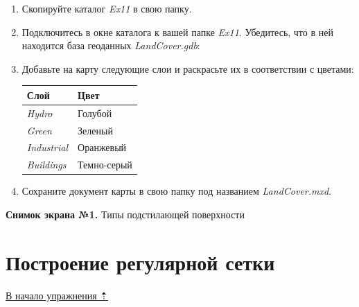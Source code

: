 \documentclass[12pt,]{book}
\begin{document}
\begin{enumerate}
\def\labelenumi{\arabic{enumi}.}
\item
  Скопируйте каталог \emph{Ex11} в свою папку.
\item
  Подключитесь в окне каталога к вашей папке \emph{Ex11}. Убедитесь, что в ней находится база геоданных \emph{LandCover.gdb}:
\item
  Добавьте на карту следующие слои и раскрасьте их в соответствии с цветами:

  \begin{longtable}[]{@{}ll@{}}
  \toprule
  Слой & Цвет\tabularnewline
  \midrule
  \endhead
  \emph{Hydro} & Голубой\tabularnewline
  \emph{Green} & Зеленый\tabularnewline
  \emph{Industrial} & Оранжевый\tabularnewline
  \emph{Buildings} & Темно-серый\tabularnewline
  \bottomrule
  \end{longtable}
\item
  Сохраните документ карты в свою папку под названием \emph{LandCover.mxd}.
\end{enumerate}

\textbf{Снимок экрана №1.} Типы подстилающей поверхности

\hypertarget{land-cover-hydro-fishnet}{%
\section{Построение регулярной сетки}\label{land-cover-hydro-fishnet}}

\protect\hyperlink{land-cover-hydro}{В начало упражнения ⇡}
\end{document}

